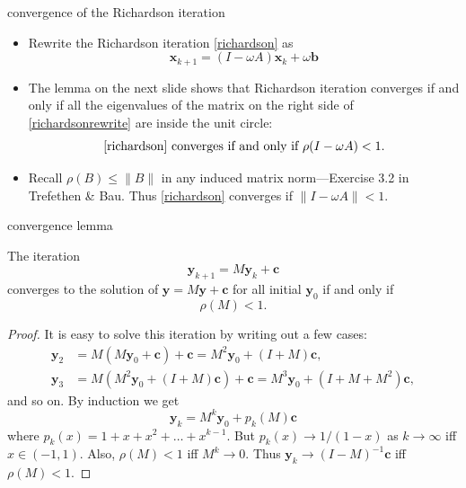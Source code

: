 \documentclass[10pt,hyperref]{beamer}
\newcommand{\bb}{\mathbf{b}}
\newcommand{\bc}{\mathbf{c}}
\newcommand{\bx}{\mathbf{x}}
\newcommand{\by}{\mathbf{y}}
\begin{document}
\begin{frame}{convergence of the Richardson iteration}

\begin{itemize}
\item Rewrite the Richardson iteration \eqref{richardson} as
\begin{equation}
    \bx_{k+1} = (I - \omega A) \bx_k + \omega \bb  \label{richardsonrewrite}
\end{equation}
\item The lemma on the next slide shows that Richardson iteration converges if and only if all the eigenvalues of the matrix on the right side of \eqref{richardsonrewrite} are inside the unit circle:
\begin{equation}
\text{\eqref{richardson} converges if and only if } \rho(I-\omega A) < 1.
\end{equation}

\item  Recall $\rho(B) \le \|B\|$ in any induced matrix norm---Exercise 3.2 in Trefethen \& Bau.  Thus \eqref{richardson} converges if $\|I-\omega A\| < 1$.
\end{itemize}
\end{frame}


\begin{frame}{convergence lemma}

\begin{lemma}  The iteration
   $$\by_{k+1} = M \by_k + \bc$$
converges to the solution of $\by = M \by + \bc$ for all initial $\by_0$ if and only if
   $$\rho(M) < 1.$$
\end{lemma}

\small
\begin{proof}
It is easy to solve this iteration by writing out a few cases:
\begin{align*}
   \by_2 &= M (M \by_0 + \bc) + \bc = M^2 \by_0 + (I + M) \bc, \\
   \by_3 &= M (M^2 \by_0 + (I + M) \bc) + \bc = M^3 \by_0 + (I + M + M^2) \bc,
\end{align*}
and so on.  By induction we get
    $$\by_k = M^k \by_0 + p_k(M) \bc$$
where $p_k(x) = 1 + x + x^2 + \dots + x^{k-1}$.  But $p_k(x) \to 1/(1-x)$ as $k\to\infty$ iff $x\in(-1,1)$.  Also, $\rho(M)<1$ iff $M^k \to 0$.  Thus $\by_k \to (I-M)^{-1} \bc$ iff $\rho(M) < 1$.
\end{proof}
\end{frame}
\end{document}
